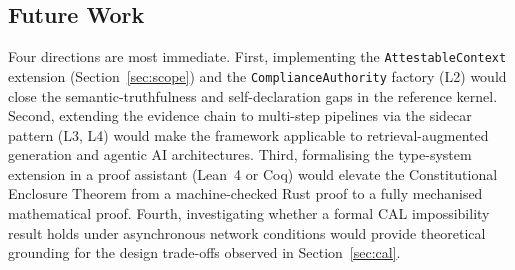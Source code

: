 \subsection{Future Work}
\label{sec:future}

Four directions are most immediate.
First, implementing the \texttt{AttestableContext} extension
(Section~\ref{sec:scope}) and the \texttt{ComplianceAuthority}
factory (L2) would close the semantic-truthfulness and
self-declaration gaps in the reference kernel.
Second, extending the evidence chain to multi-step pipelines via
the sidecar pattern (L3, L4) would make the framework applicable
to retrieval-augmented generation and agentic AI architectures.
Third, formalising the type-system extension in a proof assistant
(Lean~4 or Coq) would elevate the Constitutional Enclosure
Theorem from a machine-checked Rust proof to a fully mechanised
mathematical proof.
Fourth, investigating whether a formal CAL impossibility result
holds under asynchronous network conditions would provide
theoretical grounding for the design trade-offs observed in
Section~\ref{sec:cal}.
